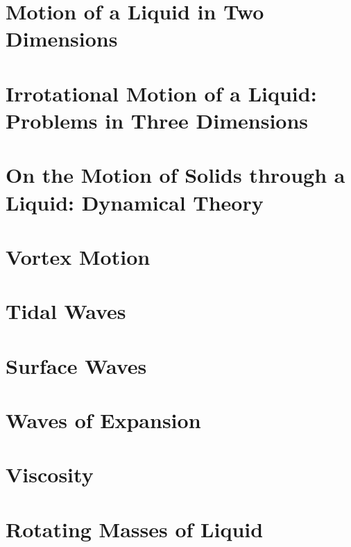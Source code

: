 \documentclass[twoside, openany]{book}
\numberwithin{equation}{article} %
\begin{document}
\chapter{Motion of a Liquid in Two Dimensions}

\chapter[Irrotational Motion of a Liquid]{Irrotational Motion of a Liquid: Problems in Three Dimensions}

\chapter[Motion of Solids through a Liquid]{On the Motion of Solids through a Liquid: Dynamical Theory}

\chapter{Vortex Motion}

\chapter{Tidal Waves}

\chapter{Surface Waves}

\chapter{Waves of Expansion}

\chapter{Viscosity}\label{ch:viscosity}

\chapter{Rotating Masses of Liquid}

\backmatter

\printindex
\end{document}
